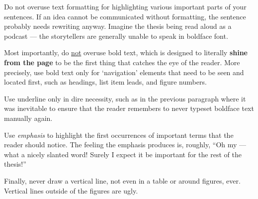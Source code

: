 Do not overuse text formatting for highlighting various important parts of your sentences. If an idea cannot be communicated without formatting, the sentence probably needs rewriting anyway. Imagine the thesis being read aloud as a podcast --- the storytellers are generally unable to speak in boldface font.

Most importantly, do \underline{not} overuse bold text, which is designed to literally \textbf{shine from the page} to be the first thing that catches the eye of the reader. More precisely, use bold text only for `navigation' elements that need to be seen and located first, such as headings, list item leads, and figure numbers.

Use underline only in dire necessity, such as in the previous paragraph where it was inevitable to ensure that the reader remembers to never typeset boldface text manually again.

Use \emph{emphasis} to highlight the first occurrences of important terms that the reader should notice. The feeling the emphasis produces is, roughly, ``Oh my --- what a nicely slanted word! Surely I expect it be important for the rest of the thesis!''

Finally, never draw a vertical line, not even in a table or around figures, ever. Vertical lines outside of the figures are ugly.
